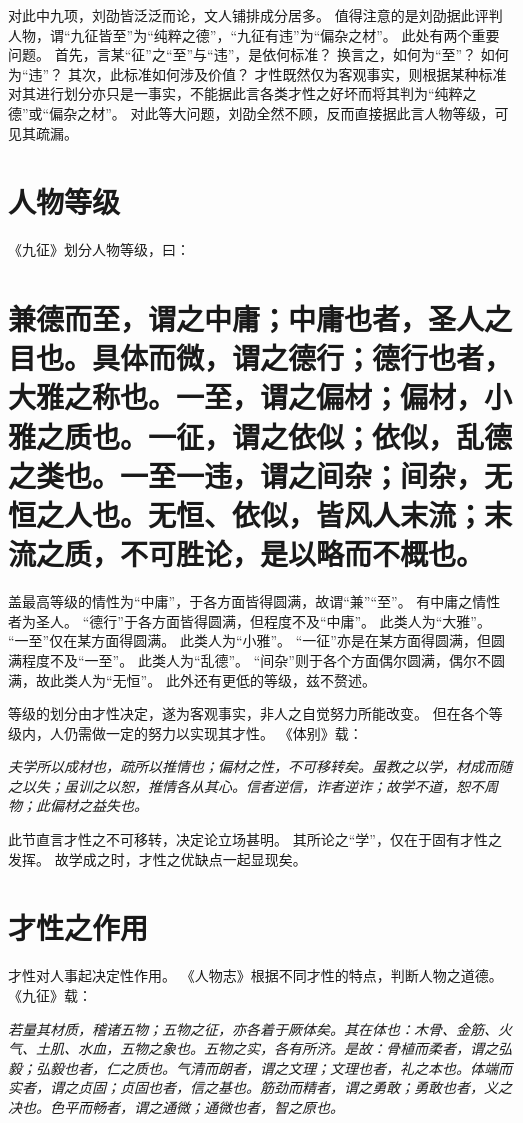 \documentclass[11pt]{article}
\begin{document}
对此中九项，刘劭皆泛泛而论，文人铺排成分居多。
值得注意的是刘劭据此评判人物，谓“九征皆至”为“纯粹之德”，“九征有违”为“偏杂之材”。
此处有两个重要问题。
首先，言某“征”之“至”与“违”，是依何标准？
换言之，如何为“至”？
如何为“违”？
其次，此标准如何涉及价值？
才性既然仅为客观事实，则根据某种标准对其进行划分亦只是一事实，不能据此言各类才性之好坏而将其判为“纯粹之德”或“偏杂之材”。
对此等大问题，刘劭全然不顾，反而直接据此言人物等级，可见其疏漏。

\section{人物等级}
《九征》划分人物等级，曰：

\section{兼德而至，谓之中庸；中庸也者，圣人之目也。具体而微，谓之德行；德行也者，大雅之称也。一至，谓之偏材；偏材，小雅之质也。一征，谓之依似；依似，乱德之类也。一至一违，谓之间杂；间杂，无恒之人也。无恒、依似，皆风人末流；末流之质，不可胜论，是以略而不概也。}

盖最高等级的情性为“中庸”，于各方面皆得圆满，故谓“兼”“至”。
有中庸之情性者为圣人。
“德行”于各方面皆得圆满，但程度不及“中庸”。
此类人为“大雅”。
“一至”仅在某方面得圆满。
此类人为“小雅”。
“一征”亦是在某方面得圆满，但圆满程度不及“一至”。
此类人为“乱德”。
“间杂”则于各个方面偶尔圆满，偶尔不圆满，故此类人为“无恒”。
此外还有更低的等级，兹不赘述。

\par

等级的划分由才性决定，遂为客观事实，非人之自觉努力所能改变。
但在各个等级内，人仍需做一定的努力以实现其才性。
《体别》载：

\textit{夫学所以成材也，疏所以推情也；偏材之性，不可移转矣。虽教之以学，材成而随之以失；虽训之以恕，推情各从其心。信者逆信，诈者逆诈；故学不道，恕不周物；此偏材之益失也。}

此节直言才性之不可移转，决定论立场甚明。
其所论之“学”，仅在于固有才性之发挥。
故学成之时，才性之优缺点一起显现矣。

\section{才性之作用}
才性对人事起决定性作用。
《人物志》根据不同才性的特点，判断人物之道德。
《九征》载：

\textit{若量其材质，稽诸五物；五物之征，亦各着于厥体矣。其在体也：木骨、金筋、火气、土肌、水血，五物之象也。五物之实，各有所济。是故：骨植而柔者，谓之弘毅；弘毅也者，仁之质也。气清而朗者，谓之文理；文理也者，礼之本也。体端而实者，谓之贞固；贞固也者，信之基也。筋劲而精者，谓之勇敢；勇敢也者，义之决也。色平而畅者，谓之通微；通微也者，智之原也。}
\end{document}
